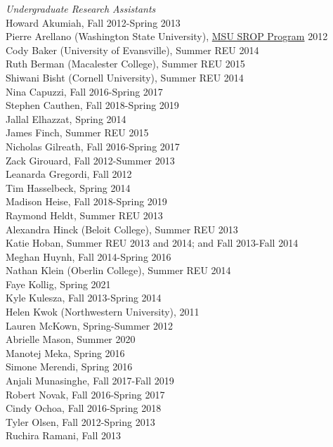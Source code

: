 \documentclass[9pt]{extarticle}
\begin{document}
\emph{Undergraduate Research Assistants} \\[1pt]
Howard Akumiah, Fall 2012-Spring 2013 \\
Pierre Arellano (Washington State University), \href{http://grad.msu.edu/srop/}{MSU SROP Program} 2012 \\
Cody Baker (University of Evansville), Summer REU 2014 \\
Ruth Berman (Macalester College), Summer REU 2015 \\
Shiwani Bisht (Cornell University), Summer REU 2014 \\
Nina Capuzzi, Fall 2016-Spring 2017 \\
Stephen Cauthen, Fall 2018-Spring 2019 \\
Jallal Elhazzat, Spring 2014 \\
James Finch, Summer REU 2015 \\
Nicholas Gilreath, Fall 2016-Spring 2017 \\
Zack Girouard, Fall 2012-Summer 2013 \\
Leanarda Gregordi, Fall 2012 \\
Tim Hasselbeck, Spring 2014 \\
Madison Heise, Fall 2018-Spring 2019 \\
Raymond Heldt, Summer REU 2013 \\
Alexandra Hinck (Beloit College), Summer REU 2013 \\
Katie Hoban, Summer REU 2013 and 2014; and Fall 2013-Fall 2014 \\
Meghan Huynh, Fall 2014-Spring 2016 \\
Nathan Klein (Oberlin College), Summer REU 2014 \\
Faye Kollig, Spring 2021 \\
Kyle Kulesza, Fall 2013-Spring 2014 \\
Helen Kwok (Northwestern University), 2011 \\
Lauren McKown, Spring-Summer 2012 \\
Abrielle Mason, Summer 2020 \\
Manotej Meka, Spring 2016 \\
Simone Merendi, Spring 2016 \\
Anjali Munasinghe, Fall 2017-Fall 2019 \\
Robert Novak, Fall 2016-Spring 2017 \\
Cindy Ochoa, Fall 2016-Spring 2018 \\
Tyler Olsen, Fall 2012-Spring 2013 \\
Ruchira Ramani, Fall 2013 \\
\end{document}
